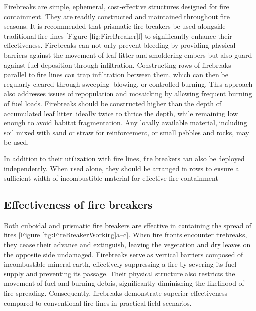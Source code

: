 \documentclass[
  12 pt,
]{Nemilov}
\begin{document}
Firebreaks are simple, ephemeral, cost-effective structures designed for fire containment. They are readily constructed and maintained throughout fire seasons. It is recommended that prismatic fire breakers be used alongside traditional fire lines {[}Figure \ref{fig:FireBreaker}f{]} to significantly enhance their effectiveness. Firebreaks can not only prevent bleeding by providing physical barriers against the movement of leaf litter and smoldering embers but also guard against fuel deposition through infiltration. Constructing rows of firebreaks parallel to fire lines can trap infiltration between them, which can then be regularly cleared through sweeping, blowing, or controlled burning. This approach also addresses issues of repopulation and mosaicking by allowing frequent burning of fuel loads. Firebreaks should be constructed higher than the depth of accumulated leaf litter, ideally twice to thrice the depth, while remaining low enough to avoid habitat fragmentation. Any locally available material, including soil mixed with sand or straw for reinforcement, or small pebbles and rocks, may be used.

In addition to their utilization with fire lines, fire breakers can also be deployed independently. When used alone, they should be arranged in rows to ensure a sufficient width of incombustible material for effective fire containment.

\subsection{Effectiveness of fire breakers}\label{effectiveness-of-fire-breakers}

Both cuboidal and prismatic fire breakers are effective in containing the spread of fires {[}Figure \ref{fig:FireBreakerWorking}a--c{]}. When fire fronts encounter firebreaks, they cease their advance and extinguish, leaving the vegetation and dry leaves on the opposite side undamaged. Firebreaks serve as vertical barriers composed of incombustible mineral earth, effectively suppressing a fire by severing its fuel supply and preventing its passage. Their physical structure also restricts the movement of fuel and burning debris, significantly diminishing the likelihood of fire spreading. Consequently, firebreaks demonstrate superior effectiveness compared to conventional fire lines in practical field scenarios.
\end{document}

